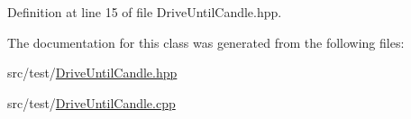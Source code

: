 Definition at line 15 of file Drive\-Until\-Candle.\-hpp.



The documentation for this class was generated from the following files\-:\begin{DoxyCompactItemize}
\item 
src/test/\hyperlink{DriveUntilCandle_8hpp}{Drive\-Until\-Candle.\-hpp}\item 
src/test/\hyperlink{DriveUntilCandle_8cpp}{Drive\-Until\-Candle.\-cpp}\end{DoxyCompactItemize}
